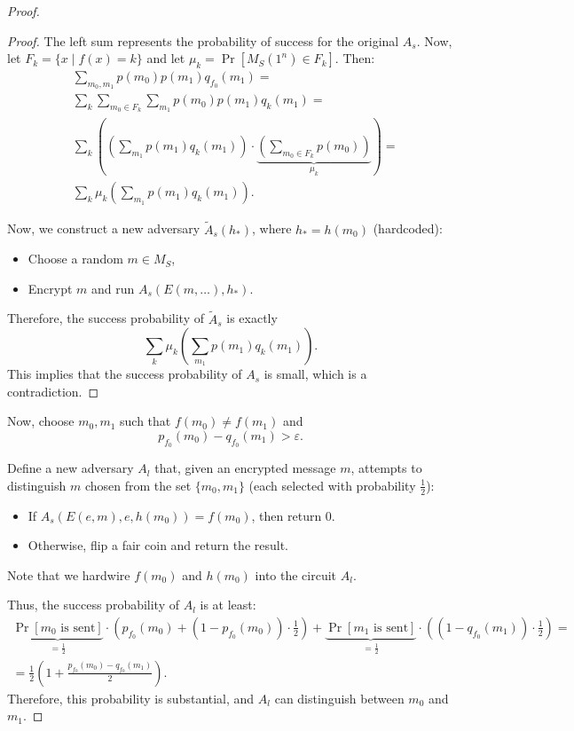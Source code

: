 \begin{proof}
\begin{proof}
		The left sum represents the probability of success for the original $A_s$.
		Now, let $F_k = \{x \mid f(x) = k\}$ and let $\mu_k = \Pr[M_S(1^{n}) \in F_k]$.
		Then:
		\begin{align*}
			&\sum_{m_0, m_1} p(m_0) p(m_1) q_{f_0}(m_1) = \\
			& \sum_{k} \sum_{m_0 \in F_k} \sum_{m_1} p(m_0) p(m_1) q_k(m_1) = \\   
			& \sum_{k} \left(\left(\sum_{m_1} p(m_1) q_k(m_1) \right) \cdot \underbrace{\left(\sum_{m_0 \in F_k} p(m_0)\right)}_{\mu_k} \right) = \\
			& \sum_{k} \mu_k \left( \sum_{m_1} p(m_1) q_k(m_1) \right).
		\end{align*}

		Now, we construct a new adversary $\tilde{A}_s(h_*)$, where $h_* = h(m_0)$ (hardcoded):
		\begin{itemize}
			\item Choose a random $m \in M_S$,
			\item Encrypt $m$ and run $A_s(E(m, \ldots), h_*)$.
		\end{itemize}
		Therefore, the success probability of $\tilde{A}_s$ is exactly
		\[
		\sum_{k} \mu_k \left( \sum_{m_1} p(m_1) q_k(m_1) \right).
		\] 
		This implies that the success probability of $A_s$ is small, which is a contradiction.
	\end{proof}

	Now, choose $m_0, m_1$ such that $f(m_0) \neq f(m_1)$ and
	\[
		p_{f_0}(m_0) - q_{f_0}(m_1) > \varepsilon.
	\] 

	Define a new adversary $A_l$ that, given an encrypted message $m$, attempts to distinguish $m$ chosen from the set $\{m_0, m_1\}$ (each selected with probability $\frac{1}{2}$):
	\begin{itemize}
		\item If $A_s(E(e, m), e, h(m_0)) = f(m_0)$, then return 0.
		\item Otherwise, flip a fair coin and return the result.
	\end{itemize}
	Note that we hardwire $f(m_0)$ and $h(m_0)$ into the circuit $A_l$.

	Thus, the success probability of $A_l$ is at least:
	\begin{align*}
		\underbrace{\Pr[m_0 \text{ is sent}]}_{=\frac{1}{2}} \cdot \left(p_{f_0}(m_0) + (1 - p_{f_0}(m_0)) \cdot \frac{1}{2}\right) + \underbrace{\Pr[m_1 \text{ is sent}]}_{=\frac{1}{2}} \cdot \left((1 - q_{f_0}(m_1)) \cdot \frac{1}{2}\right) = \\
		= \frac{1}{2} \left(1 + \frac{p_{f_0}(m_0) - q_{f_0}(m_1)}{2}\right).
	\end{align*}
	Therefore, this probability is substantial, and $A_l$ can distinguish between $m_0$ and $m_1$.
\end{proof}

